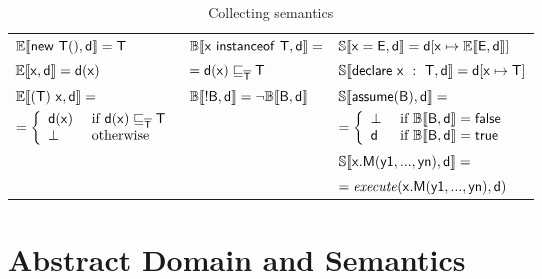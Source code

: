 \documentclass{llncs}
\begin{document}
\begin{table}[t]
\begin{center}
\begin{tabular}{l|l|l}
$\mathbb{E}\llbracket \mathtt{\mathsf{new\ T()}, \mathsf{d}} \rrbracket=\mathsf{T}$ & 
$\mathbb{B}\llbracket \mathtt{\mathsf{x\ instanceof\ T}, \mathsf{d}} \rrbracket=$ &
$\mathbb{S}\llbracket \mathtt{\mathsf{x = E}, \mathsf{d}} \rrbracket=\mathsf{d}[\mathsf{x} \mapsto \mathbb{E}\llbracket \mathtt{\mathsf{E}, \mathsf{d}} \rrbracket]$\\

$\mathbb{E}\llbracket \mathtt{\mathsf{x}, \mathsf{d}} \rrbracket=\mathsf{d}(\mathsf{x})$ &
\hspace{10pt} $=\mathsf{d}(\mathsf{x}) \sqsubseteq_{\mathsf{\overline{T}}} \mathsf{T}$ &
$\mathbb{S}\llbracket \mathtt{\mathsf{declare\ x\ :\ T}, \mathsf{d}} \rrbracket=\mathsf{d}[\mathsf{x} \mapsto \mathsf{T}]$\\


$\mathbb{E}\llbracket \mathtt{\mathsf{(T)\ x}, \mathsf{d}} \rrbracket=$ &
$\mathbb{B}\llbracket \mathtt{\mathsf{! B}, \mathsf{d}} \rrbracket = \neg \mathbb{B}\llbracket \mathtt{\mathsf{B}, \mathsf{d}} \rrbracket$& 
$\mathbb{S}\llbracket \mathtt{\mathsf{assume(B)}, \mathsf{d}} \rrbracket=$\\

\hspace{10pt} $=\left\{
\begin{array}{ll}
\mathsf{d}(\mathsf{x}) & \textrm{ if } \mathsf{d}(\mathsf{x}) \sqsubseteq_{\mathsf{\overline{T}}} \mathsf{T}\\
\bot & \textrm{ otherwise}\\
\end{array}
\right.$&
&
\hspace{10pt} $=\left\{
\begin{array}{ll}
\bot & \textrm{ if } \mathbb{B}\llbracket \mathtt{\mathsf{B}, \mathsf{d}} \rrbracket=\mathsf{false}\\
\mathsf{d} & \textrm{ if } \mathbb{B}\llbracket \mathtt{\mathsf{B}, \mathsf{d}} \rrbracket=\mathsf{true}\\
\end{array}
\right.$
\\

&
&
$\mathbb{S}\llbracket \mathtt{\mathsf{x.M(y1, ..., yn)}, \mathsf{d}} \rrbracket=$\\

&
&
\hspace{10pt} $=\mathit{execute}(\mathsf{x.M(y1, ..., yn)}, \mathsf{d})$\\
\end{tabular}
\end{center}
\caption{Collecting semantics}
\label{fig:collectingsemantics}
\end{table}


\section{Abstract Domain and Semantics}
\label{sect:domain}
\end{document}
